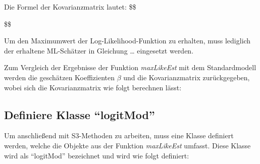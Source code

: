 \documentclass[12pt,]{article}
\begin{document}
Die Formel der Kovarianzmatrix lautet: \$\$

\$\$

Um den Maximumwert der Log-Likelihood-Funktion zu erhalten, muss
lediglich der erhaltene ML-Schätzer in Gleichung \ldots{} eingesetzt
werden.

Zum Vergleich der Ergebnisse der Funktion \emph{maxLikeEst} mit dem
Standardmodell werden die geschätzen Koeffizienten \(\beta\) und die
Kovarianzmatrix zurückgegeben, wobei sich die Kovarianzmatrix wie folgt
berechnen lässt:

\subsection{\texorpdfstring{Definiere Klasse
``logitMod''}{Definiere Klasse logitMod}}\label{definiere-klasse-logitmod}

Um anschließend mit S3-Methoden zu arbeiten, muss eine Klasse definiert
werden, welche die Objekte aus der Funktion \emph{maxLikeEst} umfasst.
Diese Klasse wird als ``logitMod'' bezeichnet und wird wie folgt
definiert:
\end{document}
